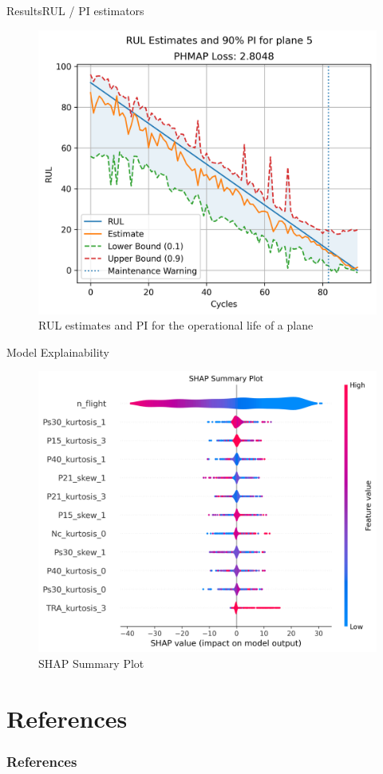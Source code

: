 \documentclass{beamer}
\begin{document}
    \begin{frame}{Results}{RUL / PI estimators}
        \begin{figure}[!htbp]
            \centering
            \includegraphics[scale=0.55]{preds_DS03-012_5.png}
            \caption{RUL estimates and PI for the operational life of a plane}
        \end{figure}
    \end{frame}

    \begin{frame}{Model Explainability}
        \begin{figure}[!htbp]
            \centering
            \includegraphics[scale=0.4]{shap_summary.png}
            \caption{SHAP Summary Plot}
        \end{figure}
    \end{frame}

    \section*{References}
    \begin{frame}[allowframebreaks]
        \frametitle{References}
        \printbibliography
    \end{frame}
\end{document}
